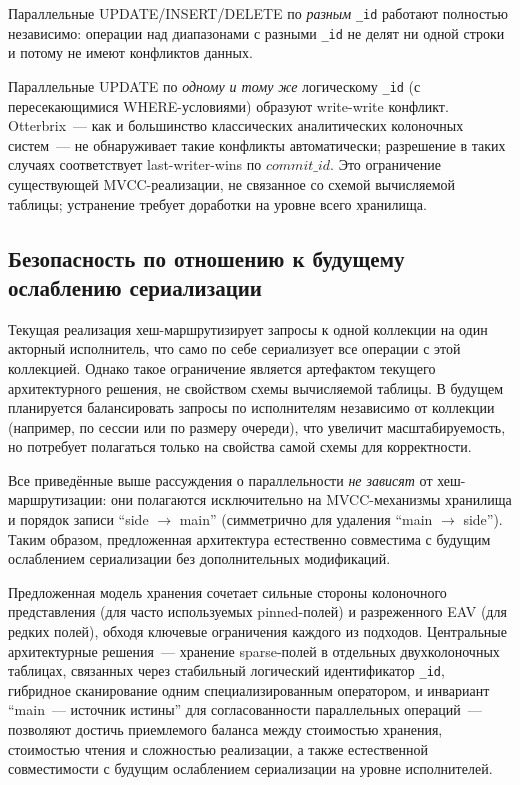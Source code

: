 Параллельные UPDATE/INSERT/DELETE по \emph{разным} \texttt{\_id}
работают полностью независимо: операции над диапазонами с разными
\texttt{\_id} не делят ни одной строки и потому не имеют конфликтов
данных.

Параллельные UPDATE по \emph{одному и тому же} логическому
\texttt{\_id} (с пересекающимися WHERE-условиями) образуют
write-write конфликт. Otterbrix~--- как и большинство классических
аналитических колоночных систем~--- не обнаруживает такие конфликты
автоматически; разрешение в таких случаях соответствует
last-writer-wins по $\mathit{commit\_id}$. Это ограничение
существующей MVCC-реализации, не связанное со схемой вычисляемой
таблицы; устранение требует доработки на уровне всего хранилища.

\subsection{Безопасность по отношению к будущему ослаблению
сериализации}

Текущая реализация хеш-маршрутизирует запросы к одной коллекции на
один акторный исполнитель, что само по себе сериализует все
операции с этой коллекцией. Однако такое ограничение является
артефактом текущего архитектурного решения, не свойством схемы
вычисляемой таблицы. В будущем планируется балансировать запросы по
исполнителям независимо от коллекции (например, по сессии или
по размеру очереди), что увеличит масштабируемость, но потребует
полагаться только на свойства самой схемы для корректности.

Все приведённые выше рассуждения о параллельности \emph{не зависят}
от хеш-маршрутизации: они полагаются исключительно на
MVCC-механизмы хранилища и порядок записи ``side $\to$ main''
(симметрично для удаления ``main $\to$ side''). Таким образом,
предложенная архитектура естественно совместима с будущим
ослаблением сериализации без дополнительных модификаций.

\chapterconclusion

Предложенная модель хранения сочетает сильные стороны колоночного
представления (для часто используемых pinned-полей) и разреженного
EAV (для редких полей), обходя ключевые ограничения каждого из
подходов. Центральные архитектурные решения~--- хранение
sparse-полей в отдельных двухколоночных таблицах, связанных через
стабильный логический идентификатор \texttt{\_id}, гибридное
сканирование одним специализированным оператором, и инвариант
``main~--- источник истины'' для согласованности параллельных
операций~--- позволяют достичь приемлемого баланса между стоимостью
хранения, стоимостью чтения и сложностью реализации, а также
естественной совместимости с будущим ослаблением сериализации на
уровне исполнителей.

